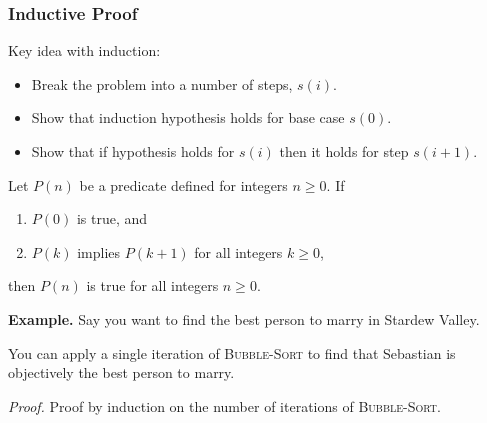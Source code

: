 \subsubsection{Inductive Proof}

Key idea with induction:

\begin{itemize}
    \item Break the problem into a number of steps, $s(i)$. 
    \item Show that induction hypothesis holds for base case $s(0)$. 
    \item Show that if hypothesis holds for $s(i)$ then it holds for step $s(i+1)$.
\end{itemize}

\begin{theorem}
    Let $P(n)$ be a predicate defined for integers $n \geq 0$. If
    \begin{enumerate}
        \item $P(0)$ is true, and
        \item $P(k)$ implies $P(k+1)$ for all integers $k \geq 0$,
    \end{enumerate}
    then $P(n)$ is true for all integers $n \geq 0$.
\end{theorem}

\textbf{\color{primary}Example.}
    Say you want to find the best person to marry in Stardew Valley. 


    You can apply a single iteration of \textsc{Bubble-Sort} to find that Sebastian is objectively the best person to marry. 

    \begin{algorithm}
        \begin{algorithmic}[1]
                            \State {}
                        \EndIf
                    \EndFor
                \EndFor
            \EndFunction
        \end{algorithmic}
    \end{algorithm}

    \textit{Proof.}
        Proof by induction on the number of iterations of \textsc{Bubble-Sort}.


